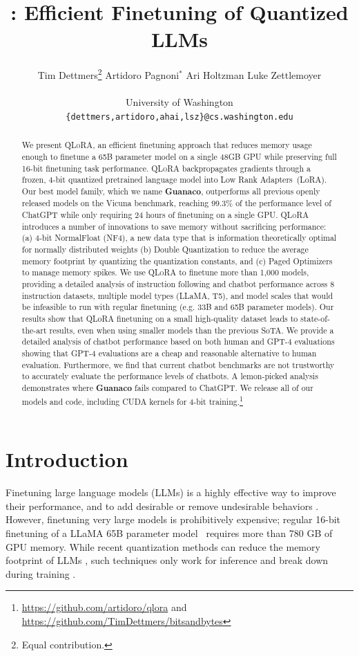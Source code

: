 \documentclass{article}
\title{\method: Efficient Finetuning of Quantized LLMs}
\author{Tim Dettmers\thanks{Equal contribution.} \And Artidoro Pagnoni$^*$ \And Ari Holtzman \And Luke Zettlemoyer\\\\
    University of Washington \\ \texttt{\{dettmers,artidoro,ahai,lsz\}@cs.washington.edu}
 }
\newcommand{\method}{\textsc{QLoRA}\xspace}
\newcommand{\bfmodel}{\textbf{Guanaco}\xspace}
\newcommand{\Doublequant}{Double Quantization\xspace}
\newcommand{\Pagedoptim}{Paged Optimizers\xspace}
\begin{document}
\maketitle


\begin{abstract}
We present \method, an efficient finetuning approach that reduces memory usage enough to finetune a 65B parameter model on a single 48GB GPU while preserving full 16-bit finetuning task performance. \method backpropagates gradients through a frozen, 4-bit quantized pretrained language model into Low Rank Adapters~(LoRA). Our best model family, which we name \bfmodel, outperforms all previous openly released models on the Vicuna benchmark, reaching 99.3\% of the performance level of ChatGPT while only requiring 24 hours of finetuning on a single GPU. \method introduces a number of innovations to save memory without sacrificing performance: (a) 4-bit NormalFloat (NF4), a new data type that is information theoretically optimal for normally distributed weights (b) \Doublequant to reduce the average memory footprint by quantizing the quantization constants, and (c) \Pagedoptim to manage memory spikes. We use \method to finetune more than 1,000 models, providing a detailed analysis of instruction following and chatbot performance across 8 instruction datasets, multiple model types (LLaMA, T5), and model scales that would be infeasible to run with regular finetuning (e.g. 33B and 65B parameter models). Our results show that QLoRA finetuning on a small high-quality dataset leads to state-of-the-art results, even when using smaller models than the previous SoTA. We provide a detailed analysis of chatbot performance based on both human and GPT-4 evaluations showing that GPT-4 evaluations are a cheap and reasonable alternative to human evaluation. Furthermore, we find that current chatbot benchmarks are not trustworthy to accurately evaluate the performance levels of chatbots. A lemon-picked analysis demonstrates where \bfmodel fails compared to ChatGPT. We release all of our models and code, including CUDA kernels for 4-bit training.\footnote{\url{https://github.com/artidoro/qlora} and \url{https://github.com/TimDettmers/bitsandbytes}}
\end{abstract}

\section{Introduction}

Finetuning large language models (LLMs) is a highly effective way to improve their performance, \citep{min2021metaicl, wei2021finetuned, ouyang2022training, wang2022super, wang2022self, liu2022few} and to add desirable or remove undesirable behaviors \citep{ouyang2022training,askell2021general,bai2022training}.
However, finetuning very large models is prohibitively expensive; regular 16-bit finetuning of a LLaMA 65B parameter model~\citep{touvron2023llama} requires more than 780 GB of GPU memory. While recent quantization methods can reduce the memory footprint of LLMs \citep{dettmers2022llm, dettmers2022case, frantar2022gptq, xiao2022smoothquant}, such techniques only work for inference and break down during training \citep{wortsman2023stable}. 
\end{document}
